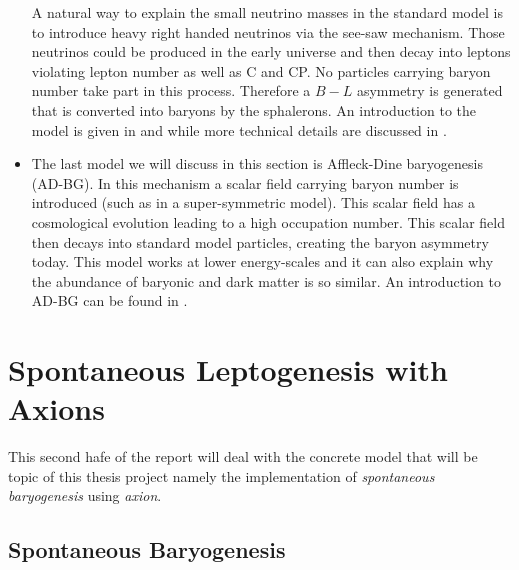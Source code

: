 \documentclass[13pt,a4paper,titlepage]{article}
\begin{document}
\begin{itemize}
    A natural way to explain the small neutrino masses in the standard model is to introduce heavy right handed neutrinos via the see-saw mechanism.
    Those neutrinos could be produced in the early universe and then decay into leptons violating lepton number as well as C and CP. No particles carrying baryon
    number take part in this process.
    Therefore a $B - L$ asymmetry is generated that is converted into baryons by the sphalerons. An introduction to the model is given in \cite{Leptogenesis_review_doi:10.1146/annurev.nucl.55.090704.151558} and \cite{Leptogenesis_Buchmüller:2014} while more technical details are discussed in \cite{Pedestrians_Buchm_ller_2005}.
    \item The last model we will discuss in this section is Affleck-Dine baryogenesis (AD-BG).
    In this mechanism a scalar field carrying baryon number is introduced (such as in a super-symmetric model).
    This scalar field has a cosmological evolution leading to a high occupation number. This scalar field then decays into standard model particles, creating the baryon asymmetry today.
    This model works at lower energy-scales and it can also explain why the abundance of baryonic and dark matter is so similar. An introduction to AD-BG can be found in \cite[Part III]{Dine_2003_Bayrogenesis}.
\end{itemize}


\section{Spontaneous Leptogenesis with Axions}
\label{sec:spontaneour_bayrogenesis}
This second hafe of the report will deal with the concrete model that will be
topic of this thesis project namely the implementation of \emph{spontaneous baryogenesis} using \emph{axion}.

\subsection{Spontaneous Baryogenesis}
\label{sec:spontaneour_bayrogenesis_tradiaonal}
\end{document}
